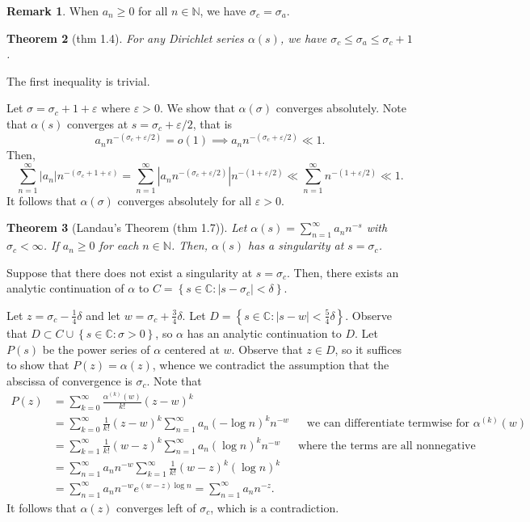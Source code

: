 \documentclass[11pt]{article}
\newtheorem{thm}{Theorem}[subsection]
\theoremstyle{definition}
\newtheorem{remark}[thm]{Remark}
\newcommand{\set}[1]{\left\{ #1 \right\}}
\newcommand{\s}[0]{\sigma}
\newcommand{\e}[0]{\varepsilon}
\newcommand{\abs}[1]{\left\lvert#1\right\rvert} %
\newcommand{\NN}{\mathbb{N}}
\newcommand{\CC}{\mathbb{C}}
\begin{document}
\begin{remark}
When $a_n\ge0$ for all $n\in\NN$, we have $\s_c=\s_a$.
\end{remark}

\begin{thm}[thm 1.4]\label{thm:1.4}
For any Dirichlet series $\alpha(s)$, we have $\s_c\le\s_a\le\s_c+1$.
\end{thm}
\proof
The first inequality is trivial.

Let $\s=\s_c+1+\e$ where $\e>0$. We show that $\alpha(\s)$ converges absolutely. Note that
$\alpha(s)$ converges at $s=\s_c+\e/2$, that is
\[
  a_nn^{-(\s_c+\e/2)} = o(1) \implies a_nn^{-(\s_c+\e/2)} \ll 1 .
\]
Then,
\[
  \sum_{n=1}^\infty\abs{a_n}n^{-(\s_c+1+\e)}
  = \sum_{n=1}^\infty\abs{a_nn^{-(\s_c+\e/2)}}n^{-(1+\e/2)}
  \ll \sum_{n=1}^\infty n^{-(1+\e/2)} \ll 1 .
\]
It follows that $\alpha(\s)$ converges absolutely for all $\e>0$.
\qedhere

\begin{thm}[Landau's Theorem (thm 1.7)]\label{thm:1.7}
Let $\alpha(s)=\sum_{n=1}^\infty a_nn^{-s}$ with $\s_c<\infty$. If $a_n\ge0$ for each
$n\in\NN$. Then, $\alpha(s)$ has a singularity at $s=\s_c$.
\end{thm}
\proof
Suppose that there does not exist a singularity at $s=\s_c$. Then, there exists an analytic
continuation of $\alpha$ to $C=\set{s\in\CC:\abs{s-\s_c}<\delta}$.

Let $z=\s_c-\frac14\delta$ and let $w=\s_c+\frac34\delta$. Let
$D=\set{s\in\CC:\abs{s-w}<\frac54\delta}$. Observe that $D\subset C\cup\set{s\in\CC:\s>0}$,
so $\alpha$ has an analytic continuation to $D$. Let $P(s)$ be the power series of $\alpha$
centered at $w$. Observe that $z\in D$, so it suffices to show that $P(z)=\alpha(z)$,
whence we contradict the assumption that the abscissa of convergence is $\s_c$. Note that
\begin{align*}
P(z) &= \sum_{k=0}^\infty \frac{\alpha^{(k)}(w)}{k!} (z-w)^k \\
&= \sum_{k=0}^\infty \frac{1}{k!}(z-w)^k \sum_{n=1}^\infty a_n(-\log n)^k n^{-w}
~~~~~~~\text{we can differentiate termwise for }\alpha^{(k)}(w) \\
&= \sum_{k=1}^\infty \frac{1}{k!}(w-z)^k \sum_{n=1}^\infty a_n(\log n)^k n^{-w}
~~~~~~~\text{where the terms are all nonnegative} \\
&= \sum_{n=1}^\infty a_nn^{-w} \sum_{k=1}^\infty \frac{1}{k!}(w-z)^k(\log n)^k \\
&= \sum_{n=1}^\infty a_nn^{-w} e^{(w-z)\log n} = \sum_{n=1}^\infty a_nn^{-z} .
\end{align*}
It follows that $\alpha(z)$ converges left of $\s_c$, which is a contradiction.
\qedhere
\end{document}
